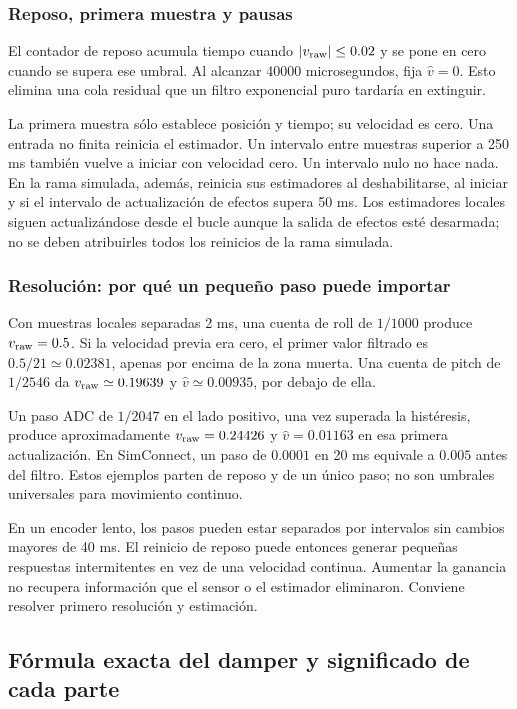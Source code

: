 \documentclass[11pt,a4paper]{article}
\newcommand{\code}[1]{\texttt{\detokenize{#1}}}
\begin{document}
\subsubsection{Reposo, primera muestra y pausas}
El contador de reposo acumula tiempo cuando $|v_{\rm raw}|\le0.02$ y se pone en cero cuando se supera ese umbral. Al alcanzar 40000 microsegundos, fija $\widehat v=0$. Esto elimina una cola residual que un filtro exponencial puro tardaría en extinguir.

La primera muestra sólo establece posición y tiempo; su velocidad es cero. Una entrada no finita reinicia el estimador. Un intervalo entre muestras superior a 250 ms también vuelve a iniciar con velocidad cero. Un intervalo nulo no hace nada. En la rama simulada, además, \code{Effects.update} reinicia sus estimadores al deshabilitarse, al iniciar y si el intervalo de actualización de efectos supera 50 ms. Los estimadores locales siguen actualizándose desde el bucle aunque la salida de efectos esté desarmada; no se deben atribuirles todos los reinicios de la rama simulada.

\subsubsection{Resolución: por qué un pequeño paso puede importar}
Con muestras locales separadas 2 ms, una cuenta de roll de $1/1000$ produce $v_{\rm raw}=0.5$. Si la velocidad previa era cero, el primer valor filtrado es $0.5/21\simeq0.02381$, apenas por encima de la zona muerta. Una cuenta de pitch de $1/2546$ da $v_{\rm raw}\simeq0.19639$ y $\widehat v\simeq0.00935$, por debajo de ella.

Un paso ADC de $1/2047$ en el lado positivo, una vez superada la histéresis, produce aproximadamente $v_{\rm raw}=0.24426$ y $\widehat v=0.01163$ en esa primera actualización. En SimConnect, un paso de $0.0001$ en 20 ms equivale a $0.005$ antes del filtro. Estos ejemplos parten de reposo y de un único paso; no son umbrales universales para movimiento continuo.

En un encoder lento, los pasos pueden estar separados por intervalos sin cambios mayores de 40 ms. El reinicio de reposo puede entonces generar pequeñas respuestas intermitentes en vez de una velocidad continua. Aumentar la ganancia no recupera información que el sensor o el estimador eliminaron. Conviene resolver primero resolución y estimación.

\subsection{Fórmula exacta del damper y significado de cada parte}
\end{document}
